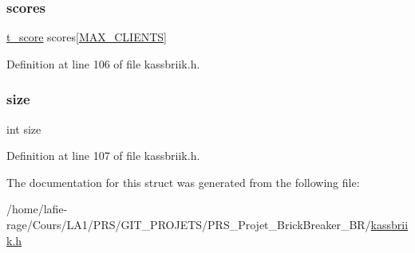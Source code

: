 \subsubsection{\texorpdfstring{scores}{scores}}
{\footnotesize\ttfamily \hyperlink{structt__score}{t\+\_\+score} scores\mbox{[}\hyperlink{kassbriik_8h_a0a8f91f93d75a07f0ae45077db45b3eb}{M\+A\+X\+\_\+\+C\+L\+I\+E\+N\+TS}\mbox{]}}



Definition at line 106 of file kassbriik.\+h.

\mbox{\label{structscores__list_a439227feff9d7f55384e8780cfc2eb82}} 
\subsubsection{\texorpdfstring{size}{size}}
{\footnotesize\ttfamily int size}



Definition at line 107 of file kassbriik.\+h.



The documentation for this struct was generated from the following file\+:\begin{DoxyCompactItemize}
\item 
/home/lafie-\/rage/\+Cours/\+L\+A1/\+P\+R\+S/\+G\+I\+T\+\_\+\+P\+R\+O\+J\+E\+T\+S/\+P\+R\+S\+\_\+\+Projet\+\_\+\+Brick\+Breaker\+\_\+\+B\+R/\hyperlink{kassbriik_8h}{kassbriik.\+h}\end{DoxyCompactItemize}
